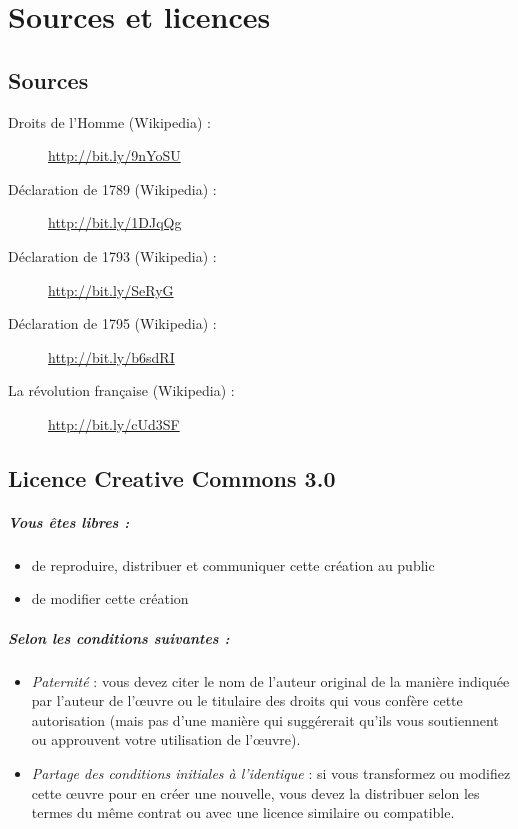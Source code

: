 \documentclass{book}
\begin{document}
\backmatter				%
 
\chapter{Sources et licences}
    
\section*{Sources}

\begin{description}
	\item[Droits de l'Homme (Wikipedia) :] \url{http://bit.ly/9nYoSU}
	\item[Déclaration de 1789 (Wikipedia) :] \url{http://bit.ly/1DJqQg}
	\item[Déclaration de 1793 (Wikipedia) :] \url{http://bit.ly/SeRyG}
	\item[Déclaration de 1795 (Wikipedia) :] \url{http://bit.ly/b6sdRI}
	\item[La révolution française (Wikipedia) :] \url{http://bit.ly/cUd3SF}
\end{description}
    
\section*{Licence Creative Commons 3.0}

\paragraph{Vous êtes libres :}    	
\begin{itemize}
	\item de reproduire, distribuer et communiquer cette création au public
	\item de modifier cette création
\end{itemize}
  	
\paragraph{Selon les conditions suivantes :}
\begin{itemize}
	\item \emph{Paternité} : vous devez citer le nom de l'auteur original de la manière indiquée par l'auteur de l'\oe uvre ou le titulaire des droits qui vous confère cette autorisation (mais pas d'une manière qui suggérerait qu'ils vous soutiennent ou approuvent votre utilisation de l'\oe uvre).
	\item \emph{Partage des conditions initiales à l'identique} : si vous transformez ou modifiez cette \oe uvre pour en créer une nouvelle, vous devez la distribuer selon les termes du même contrat ou avec une licence similaire ou compatible.
\end{itemize}
\end{document}
